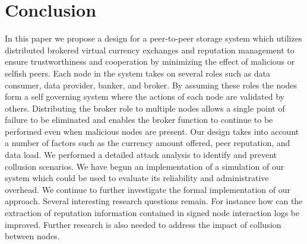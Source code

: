 \documentclass[%
				10pt,
        final,
        notitlepage,
        narroweqnarray,
        inline,
        twoside,
        ]{ieee}
\begin{document}
\section{Conclusion}
In this paper we propose a design for a peer-to-peer storage system which utilizes distributed brokered virtual currency exchanges and reputation management to ensure trustworthiness and cooperation by minimizing the effect of malicious or selfish peers.  Each node in the system takes on several roles such as data consumer, data provider, banker, and broker.  By assuming these roles the nodes form a self governing system where the actions of each node are validated by others.  Distributing the broker role to multiple nodes allows a single point of failure to be eliminated and enables the broker function to continue to be performed even when malicious nodes are present.   Our design takes into account a number of factors such as the currency amount offered, peer reputation, and data load.  We performed a detailed attack analysis to identify and prevent collusion scenarios.  We have begun an implementation of a simulation of our system which could be used to evaluate its reliability and administrative overhead.  We continue to further investigate the formal implementation of our approach.  Several interesting research questions remain.  For instance how can the extraction of reputation information contained in signed node interaction logs be improved. Further research is also needed to address the impact of collusion between nodes.

\newpage








\end{document}

